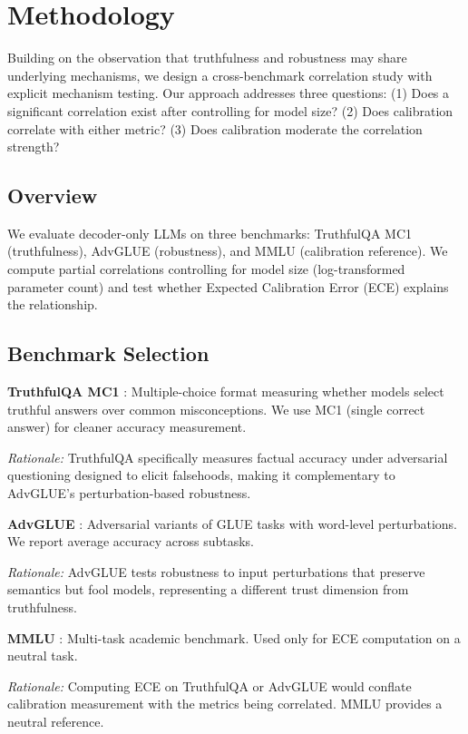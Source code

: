 \section{Methodology}
\label{sec:methodology}

Building on the observation that truthfulness and robustness may share underlying mechanisms, we design a cross-benchmark correlation study with explicit mechanism testing. Our approach addresses three questions: (1) Does a significant correlation exist after controlling for model size? (2) Does calibration correlate with either metric? (3) Does calibration moderate the correlation strength?

\subsection{Overview}

We evaluate decoder-only LLMs on three benchmarks: TruthfulQA MC1 (truthfulness), AdvGLUE (robustness), and MMLU (calibration reference). We compute partial correlations controlling for model size (log-transformed parameter count) and test whether Expected Calibration Error (ECE) explains the relationship.

\subsection{Benchmark Selection}

\textbf{TruthfulQA MC1} \cite{lin2022truthfulqa}: Multiple-choice format measuring whether models select truthful answers over common misconceptions. We use MC1 (single correct answer) for cleaner accuracy measurement.

\emph{Rationale:} TruthfulQA specifically measures factual accuracy under adversarial questioning designed to elicit falsehoods, making it complementary to AdvGLUE's perturbation-based robustness.

\textbf{AdvGLUE} \cite{wang2022advglue}: Adversarial variants of GLUE tasks with word-level perturbations. We report average accuracy across subtasks.

\emph{Rationale:} AdvGLUE tests robustness to input perturbations that preserve semantics but fool models, representing a different trust dimension from truthfulness.

\textbf{MMLU} \cite{hendrycks2021mmlu}: Multi-task academic benchmark. Used only for ECE computation on a neutral task.

\emph{Rationale:} Computing ECE on TruthfulQA or AdvGLUE would conflate calibration measurement with the metrics being correlated. MMLU provides a neutral reference.

